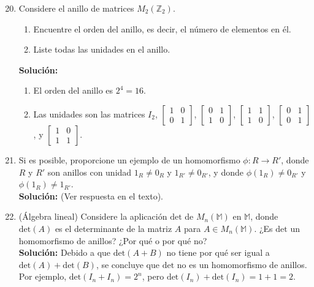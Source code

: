\begin{enumerate}
	\setcounter{enumi}{19}
	\item Considere el anillo de matrices \(M_2(\mathbb{Z}_2)\).
	\begin{enumerate}
		\item Encuentre el orden del anillo, es decir, el número de elementos en él.
		\item Liste todas las unidades en el anillo.
	\end{enumerate}
	\textbf{Solución:}
	\begin{enumerate}
		\item El orden del anillo es \(2^4 = 16\).
		\item Las unidades son las matrices \(I_2\), \(\begin{bmatrix} 1 & 0 \\ 0 & 1 \end{bmatrix}\), \(\begin{bmatrix} 0 & 1 \\ 1 & 0 \end{bmatrix}\), \(\begin{bmatrix} 1 & 1 \\ 1 & 0 \end{bmatrix}\), \(\begin{bmatrix} 0 & 1 \\ 0 & 1 \end{bmatrix}\), y \(\begin{bmatrix} 1 & 0 \\ 1 & 1 \end{bmatrix}\).
	\end{enumerate}
	\item Si es posible, proporcione un ejemplo de un homomorfismo \(\phi: R \rightarrow R'\), donde \(R\) y \(R'\) son anillos con unidad \(1_R \neq 0_R\) y \(1_{R'} \neq 0_{R'}\), y donde \(\phi(1_R) \neq 0_{R'}\) y \(\phi(1_R) \neq 1_{R'}\). \\
	\textbf{Solución:}
	(Ver respuesta en el texto).
	\item (Álgebra lineal) Considere la aplicación \(\text{det}\) de \(M_n(\mathbb{M})\) en \(\mathbb{M}\), donde \(\text{det}(A)\) es el determinante de la matriz \(A\) para \(A \in M_n(\mathbb{M})\). ¿Es \(\text{det}\) un homomorfismo de anillos? ¿Por qué o por qué no? \\
	\textbf{Solución:}
	Debido a que \(\text{det}(A + B)\) no tiene por qué ser igual a \(\text{det}(A) + \text{det}(B)\), se concluye que \(\text{det}\) no es un homomorfismo de anillos. Por ejemplo, \(\text{det}(I_n + I_n) = 2^n\), pero \(\text{det}(I_n) + \text{det}(I_n) = 1 + 1 = 2\).

\end{enumerate}

